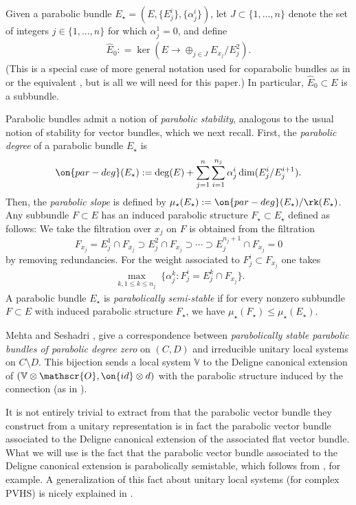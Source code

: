 Given a parabolic bundle
$E_\star = (E, \{E^i_j\}, \{\alpha^i_j\})$,
let $J \subset \{1, \ldots, n\}$ denote the set of
integers $j \in \{1, \ldots, n\}$ for which $\alpha^1_j = 0$, and define
\begin{align*}
\widehat{E}_0 : = \ker( E \to \oplus_{j \in J} E_{x_j}/E_j^2).
\end{align*}
(This is a special case of more general notation used for coparabolic bundles
as in \cite[2.2.8]{LL:geometric-local-systems} or the equivalent
\cite[Definition 2.3]{bodenY:moduli-spaces-of-parabolic-higgs-bundles}, but is all we will need for this
paper.)
In particular, $\widehat{E}_0 \subset E$ is a subbundle.

Parabolic
bundles admit a notion of \emph{parabolic stability}, analogous to the usual
notion of stability for vector bundles, which we next recall.
First, the {\em parabolic degree} of a parabolic bundle $E_\star$ is
\begin{align*}
	\on{par-deg}(E_\star) := \deg(E) + \sum_{j=1}^n \sum_{i=1}^{n_j}
	\alpha^i_j \dim(E_j^i/E_j^{i+1}).
\end{align*}
Then, the {\em parabolic slope} is defined by $\mu_\star(E_\star) :=
\on{par-deg}(E_\star)/\rk(E_\star)$.
Any subbundle $F \subset E$ has an induced parabolic structure $F_\star \subset
E_\star$ defined as
follows:
We take the filtration
over $x_j$ on $F$ is obtained
	from the filtration $$F_{x_j} = E^1_j \cap F_{x_j} \supset E^2_j \cap
	F_{x_j} \supset \cdots \supset E^{n_j+1}_j \cap F_{x_j} = 0$$
	by removing redundancies. For the weight associated to $F^i_j \subset
	F_{x_j}$ one takes $$\max_{\substack{k, 1 \leq k \leq n_j}} \{ \alpha^k_j : F^i_j = E^k_j \cap
	F_{x_j}\}.$$
A parabolic bundle $E_\star$ is {\em parabolically semi-stable} if for every
nonzero subbundle $F \subset E$ with
induced parabolic structure $F_\star$, we have $\mu_\star(F_\star) \leq
\mu_\star(E_\star)$.

Mehta and Seshadri
\cite[Theorem 4.1, Remark 4.3]{mehta1980moduli},
give a correspondence between
\emph{parabolically stable parabolic bundles of parabolic degree zero} on
$(C,D)$ and irreducible unitary local systems on $C\setminus D$.
This bijection sends a local system $\mathbb{V}$ to the Deligne canonical extension of $(\mathbb{V}\otimes \mathscr{O}, \on{id}\otimes d)$ with the parabolic structure induced by the connection (as in \cite[Definition 3.3.1]{LL:geometric-local-systems}).

\begin{remark}
\notready
It is not entirely trivial to extract from \cite{mehta1980moduli} that the parabolic vector bundle they construct from a unitary representation is in fact the parabolic vector bundle associated to the Deligne canonical extension of the associated flat vector bundle. What we will use is the fact that the parabolic vector bundle associated to the Deligne canonical extension is parabolically semistable, which follows from \cite[Theorem 5]{simpson1990harmonic}, for example. A generalization of this fact about unitary local systems (for complex PVHS) is nicely explained in \cite[\S5]{arapura2019vanishing}.
\end{remark}

